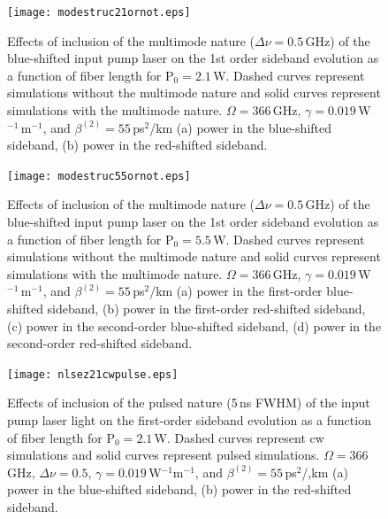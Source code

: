 \begin{figure}
\begin{center}
\texttt{[image: modestruc21ornot.eps]}
\end{center}
\renewcommand{\baselinestretch}{1}
\small\normalsize
\begin{quote}
\caption[Short caption for Figure 2.2.]
{Effects of inclusion of the multimode nature ($\Delta\nu = 0.5$\,GHz) of the blue-shifted input pump laser on the 1st order sideband evolution as a function of fiber length for P$_0 = 2.1$\,W. Dashed curves represent simulations without the multimode nature and solid curves represent simulations with the multimode nature. $\Omega = 366$\,GHz, $\gamma = 0.019$\,W$^{-1}$\,m$^{-1}$, and $\beta^{(2)} = 55$\,ps$^2$/km (a) power in the blue-shifted sideband, (b) power in the red-shifted sideband.}
\label{fig2.2}
\end{quote}
\end{figure}
\renewcommand{\baselinestretch}{1}
\small\normalsize

\begin{figure}
\begin{center}
\texttt{[image: modestruc55ornot.eps]}
\end{center}
\renewcommand{\baselinestretch}{1}
\small\normalsize
\begin{quote}
\caption[Effects of inclusion of the multimode nature]
{Effects of inclusion of the multimode nature ($\Delta\nu = 0.5$\,GHz) of the blue-shifted input pump laser on the 1st order sideband evolution as a function of fiber length for P$_0 = 5.5$\,W. Dashed curves represent simulations without the multimode nature and solid curves represent simulations with the multimode nature. $\Omega = 366$\,GHz, $\gamma = 0.019$\,W$^{-1}$\,m$^{-1}$, and $\beta^{(2)} = 55$\,ps$^2$/km (a) power in the first-order blue-shifted sideband, (b) power in the first-order red-shifted sideband, (c) power in the second-order blue-shifted sideband, (d) power in the second-order red-shifted sideband.}
\label{fig2.3}
\end{quote}
\end{figure}
\renewcommand{\baselinestretch}{1}
\small\normalsize

\begin{figure}
\begin{center}
\texttt{[image: nlsez21cwpulse.eps]}
\end{center}
\renewcommand{\baselinestretch}{1}
\small\normalsize
\begin{quote}
\caption[Effects of inclusion of the pulsed nature]
{Effects of inclusion of the pulsed nature (5\,ns FWHM) of the input pump laser light on the first-order sideband evolution as a function of fiber length for P$_0 = 2.1$\,W. Dashed curves represent cw simulations and solid curves represent pulsed simulations. $\Omega = 366$\,GHz, $\Delta\nu = 0.5$, $\gamma = 0.019$\,W$^{-1}$m$^{-1}$, and $\beta^{(2)} = 55$\,ps$^2$/,km (a) power in the blue-shifted sideband, (b) power in the red-shifted sideband.}
\label{fig2.4}
\end{quote}
\end{figure}
\renewcommand{\baselinestretch}{1}
\small\normalsize

